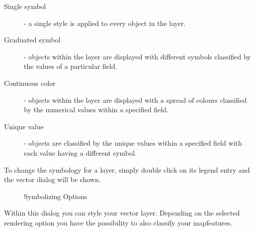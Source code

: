 \begin{description}
    \item[Single symbol] - a single style is applied to every
    object in the layer.
    \item[Graduated symbol] - objects within the layer are
    displayed with different symbols classified by the values of a
    particular field.
    \item[Continuous color] - objects within the layer are
    displayed with a spread of colours classified by the numerical
    values within a specified field.
    \item[Unique value] - objects are classified by the unique
    values within a specified field with each value having a
    different symbol.
\end{description}

To change the symbology for a layer, simply double click on its legend
entry and the vector  dialog will be
shown.

\begin{figure}[ht]
\centering
\caption{Symbolizing Options \nixcaption}
   \hspace{1cm}
   \hspace{1cm}
   \hspace{1cm}
\end{figure}


 \label{sec:style_options} 
Within this dialog you can style your vector layer. Depending on the selected
rendering option you have the possibility to also classify your mapfeatures.

